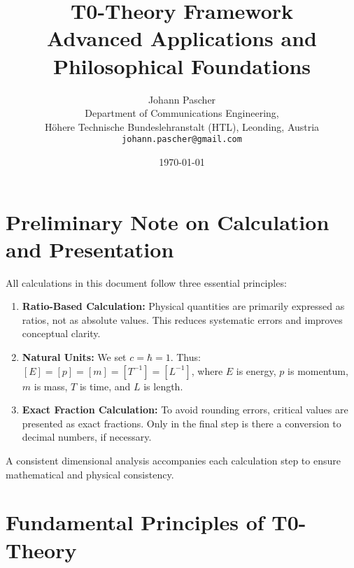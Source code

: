 \documentclass[12pt,a4paper]{article}
\title{\Huge\textbf{T0-Theory Framework}\\\Large Advanced Applications and Philosophical Foundations}
\author{Johann Pascher\\
	Department of Communications Engineering, \\Höhere Technische Bundeslehranstalt (HTL), Leonding, Austria\\
	\texttt{johann.pascher@gmail.com}}
\date{\today}
\theoremstyle{definition}
\begin{document}
	
	\maketitle
	\tableofcontents
	\thispagestyle{fancy}
	\newpage
		\section*{Preliminary Note on Calculation and Presentation}
	
	\begin{wichtig}
		All calculations in this document follow three essential principles:
		
		\begin{enumerate}[label=\textbf{\arabic*.}]
			\item \textbf{Ratio-Based Calculation:} Physical quantities are primarily expressed as ratios, not as absolute values. This reduces systematic errors and improves conceptual clarity.
			
			\item \textbf{Natural Units:} We set $c = \hbar = 1$. Thus: $[E] = [p] = [m] = [T^{-1}] = [L^{-1}]$, where $E$ is energy, $p$ is momentum, $m$ is mass, $T$ is time, and $L$ is length.
			
			\item \textbf{Exact Fraction Calculation:} To avoid rounding errors, critical values are presented as exact fractions. Only in the final step is there a conversion to decimal numbers, if necessary.
		\end{enumerate}
		
		A consistent dimensional analysis accompanies each calculation step to ensure mathematical and physical consistency.
	\end{wichtig}
	
	
	
	
	

\section{Fundamental Principles of T0-Theory}
\end{document}
